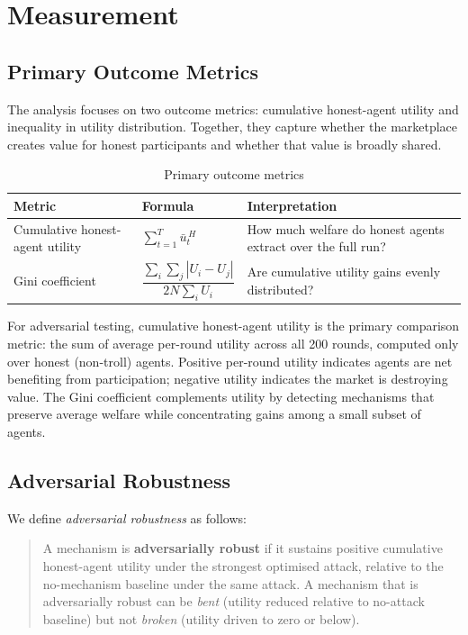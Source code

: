 \documentclass{article}
\begin{document}
\section{Measurement}
\label{sec:measurement}

\subsection{Primary Outcome Metrics}

The analysis focuses on two outcome metrics: cumulative honest-agent utility and inequality in utility distribution. Together, they capture whether the marketplace creates value for honest participants and whether that value is broadly shared.

\begin{table}[H]
\centering
\begin{tabular}{@{}lll@{}}
\toprule
Metric & Formula & Interpretation \\
\midrule
Cumulative honest-agent utility & $\sum_{t=1}^{T} \bar{u}^{\,H}_t$ & How much welfare do honest agents extract over the full run? \\[8pt]
Gini coefficient & $\dfrac{\sum_i\sum_j |U_i - U_j|}{2N\sum_i U_i}$ & Are cumulative utility gains evenly distributed? \\
\bottomrule
\end{tabular}
\caption{Primary outcome metrics}
\label{tab:metrics}
\end{table}

For adversarial testing, cumulative honest-agent utility is the primary comparison metric: the sum of average per-round utility across all 200 rounds, computed only over honest (non-troll) agents. Positive per-round utility indicates agents are net benefiting from participation; negative utility indicates the market is destroying value. The Gini coefficient complements utility by detecting mechanisms that preserve average welfare while concentrating gains among a small subset of agents.

\subsection{Adversarial Robustness}

We define \textit{adversarial robustness} as follows:

\begin{quote}
A mechanism is \textbf{adversarially robust} if it sustains positive cumulative honest-agent utility under the strongest optimised attack, relative to the no-mechanism baseline under the same attack. A mechanism that is adversarially robust can be \textit{bent} (utility reduced relative to no-attack baseline) but not \textit{broken} (utility driven to zero or below).
\end{quote}
\end{document}
